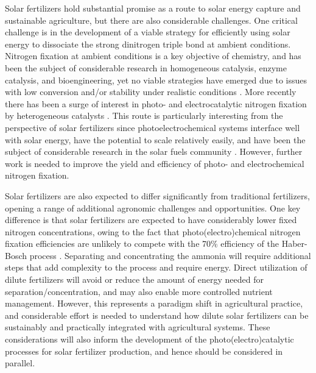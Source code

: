 Solar fertilizers hold substantial promise as a route to solar energy capture and sustainable agriculture, but there are also considerable challenges. One critical challenge is in the development of a viable strategy for efficiently using solar energy to dissociate the strong dinitrogen triple bond at ambient conditions. Nitrogen fixation at ambient conditions is a key objective of chemistry, and has been the subject of considerable research in homogeneous catalysis, enzyme catalysis, and bioengineering, yet no viable strategies have emerged due to issues with low conversion and/or stability under realistic conditions \cite{Vicente_2017,Bur_n_2017,MacLeod_2013,Foster2018}. %
More recently there has been a surge of interest in photo- and electrocatalytic nitrogen fixation by heterogeneous catalysts \cite{Medford_2017,Kyriakou_2017,Foster_2018,Chen_2018}. This route is particularly interesting from the perspective of solar fertilizers since photoelectrochemical systems interface well with solar energy, have the potential to scale relatively easily, and have been the subject of considerable research in the solar fuels community \cite{Kondratenko2013}. However, further work is needed to improve the yield and efficiency of photo- and electrochemical nitrogen fixation. %

Solar fertilizers are also expected to differ significantly from traditional fertilizers, opening a range of additional agronomic challenges and opportunities. One key difference is that solar fertilizers are expected to have considerably lower fixed nitrogen concentrations, owing to the fact that photo(electro)chemical nitrogen fixation efficiencies are unlikely to compete with the 70\% efficiency of the Haber-Bosch process \cite{Schloegl_2003, Singh_2017}. %
Separating and concentrating the ammonia will require additional steps that add complexity to the process and require energy. Direct utilization of dilute fertilizers will avoid or reduce the amount of energy needed for separation/concentration, and may also enable more controlled nutrient management. However, this represents a paradigm shift in agricultural practice, and considerable effort is needed to understand how dilute solar fertilizers can be sustainably and practically integrated with agricultural systems. These considerations will also inform the development of the photo(electro)catalytic processes for solar fertilizer production, and hence should be considered in parallel.

